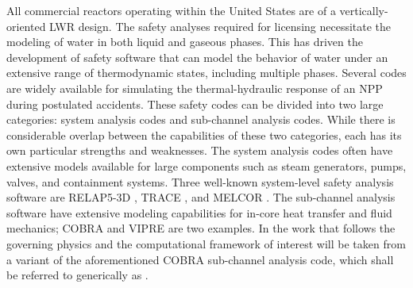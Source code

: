 All commercial reactors operating within the United States are of a vertically-oriented LWR design.
The safety analyses required for licensing necessitate the modeling of water in both liquid and gaseous phases.
This has driven the development of safety software that can model the behavior of water under an extensive range of thermodynamic states, including multiple phases.
Several codes are widely available for simulating the thermal-hydraulic response of an NPP during postulated accidents.
These safety codes can be divided into two large categories: system analysis codes and sub-channel analysis codes.
While there is considerable overlap between the capabilities of these two categories, each has its own particular strengths and weaknesses.
The system analysis codes often have extensive models available for large components such as steam generators, pumps, valves, and containment systems.
Three well-known system-level safety analysis software are RELAP5-3D \cite{RELAP}, TRACE \cite{TRACE}, and MELCOR \cite{Summers1994}.
The sub-channel analysis software have extensive modeling capabilities for in-core heat transfer and fluid mechanics; COBRA \cite{Thurgood1983c} and VIPRE are two examples.
In the work that follows the governing physics and the computational framework of interest will be taken from a variant of the aforementioned COBRA sub-channel analysis code, which shall be referred to generically as \cobra{}.
